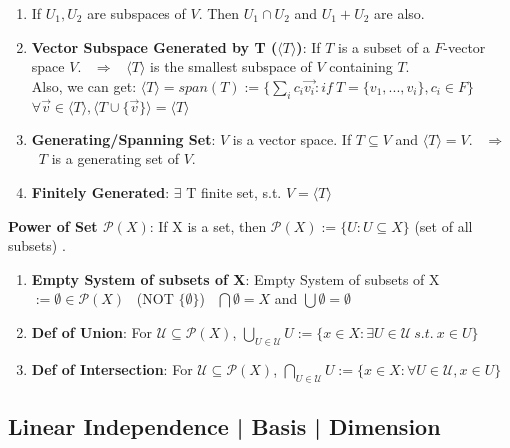 \documentclass[9pt]{article}
\begin{document}
\begin{enumerate}[itemsep=-2pt, topsep=-2pt]
    \item If $U_1,U_2$ are subspaces of $V$. Then $U_1\cap U_2$ and $U_1+U_2$ are also. 
    \item \textbf{Vector Subspace Generated by T ($\langle T \rangle$)}: {\small If $T$ is a subset of a $F$-vector space $V$. \ $\Rightarrow$ \ $\langle T \rangle$ is the smallest subspace of $V$ containing $T$.} \\
    \quad Also, we can get: $\langle T \rangle=span(T):=\{\sum_ic_i\vec{v_i}: if \ T =\{v_1,...,v_i\},c_i\in F\}$ \quad \quad \quad $\forall \vec{v}\in\langle T \rangle,\langle T \cup\{\vec{v}\}\rangle=\langle T \rangle$
    \item \textbf{Generating/Spanning Set}: $V$ is a vector space. If $T\subseteq V$ and $\langle T \rangle=V$. \ $\Rightarrow$ \ $T$ is a generating set of $V$.
    \item \textbf{Finitely Generated}: $\exists$ T finite set, s.t. $V=\langle T\rangle$
\end{enumerate}

\textbf{Power of Set $\mathcal{P}(X)$}: If X is a set, then $\mathcal{P}(X):=\{U:U\subseteq X\}$ {\scriptsize (set of all subsets)} \quad {}.

\begin{enumerate}[itemsep=-2pt, topsep=-2pt]
    \item \textbf{Empty System of subsets of X}: Empty System of subsets of X $:=\emptyset\in\mathcal{P}(X)$ \ {\scriptsize (NOT $\{\emptyset\}$)} \quad \quad \quad \star \ $\bigcap\emptyset=X$ \quad and \quad $\bigcup\emptyset=\emptyset$ \ \star
    \item \textbf{Def of Union}: For $\mathcal{U}\subseteq\mathcal{P}(X)$, $\bigcup_{U\in\mathcal{U}}U:=\{x\in X:\exists U\in\mathcal{U} \ s.t. \ x\in U\}$
    \item \textbf{Def of Intersection}: For $\mathcal{U}\subseteq\mathcal{P}(X)$, $\bigcap_{U\in\mathcal{U}}U:=\{x\in X:\forall U\in\mathcal{U},x\in U\}$
\end{enumerate}


\subsection{Linear Independence | Basis | Dimension}
\end{document}
